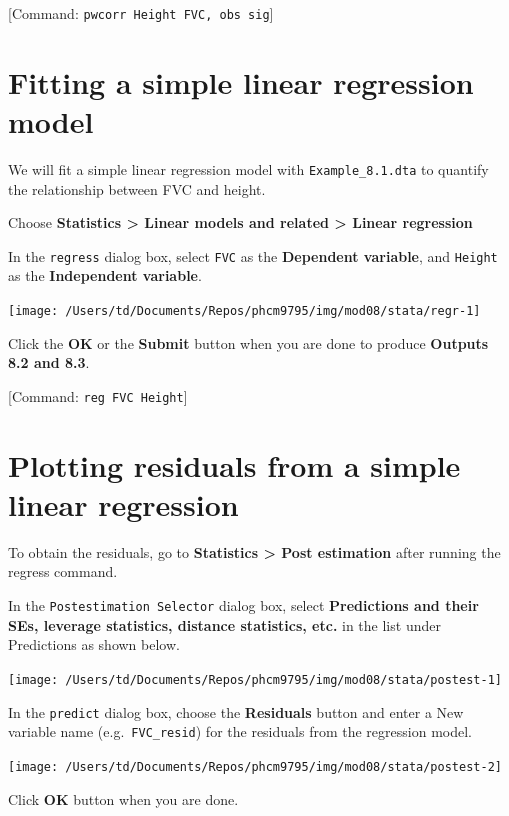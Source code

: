 \documentclass[
]{memoir}
\begin{document}
{[}Command: \texttt{pwcorr\ Height\ FVC,\ obs\ sig}{]}

\hypertarget{fitting-a-simple-linear-regression-model}{%
\section{Fitting a simple linear regression model}\label{fitting-a-simple-linear-regression-model}}

We will fit a simple linear regression model with \texttt{Example\_8.1.dta} to quantify the relationship between FVC and height.

Choose \textbf{Statistics \textgreater{} Linear models and related \textgreater{} Linear regression}

In the \texttt{regress} dialog box, select \texttt{FVC} as the \textbf{Dependent variable}, and \texttt{Height} as the \textbf{Independent variable}.

\texttt{[image: /Users/td/Documents/Repos/phcm9795/img/mod08/stata/regr-1]}

Click the \textbf{OK} or the \textbf{Submit} button when you are done to produce \textbf{Outputs 8.2 and 8.3}.

{[}Command: \texttt{reg\ FVC\ Height}{]}

\hypertarget{plotting-residuals-from-a-simple-linear-regression}{%
\section{Plotting residuals from a simple linear regression}\label{plotting-residuals-from-a-simple-linear-regression}}

To obtain the residuals, go to \textbf{Statistics \textgreater{} Post estimation} after running the regress command.

In the \texttt{Postestimation\ Selector} dialog box, select \textbf{Predictions and their SEs, leverage statistics, distance statistics, etc.} in the list under Predictions as shown below.

\texttt{[image: /Users/td/Documents/Repos/phcm9795/img/mod08/stata/postest-1]}

In the \texttt{predict} dialog box, choose the \textbf{Residuals} button and enter a New variable name (e.g.~\texttt{FVC\_resid}) for the residuals from the regression model.

\texttt{[image: /Users/td/Documents/Repos/phcm9795/img/mod08/stata/postest-2]}

Click \textbf{OK} button when you are done.
\end{document}
